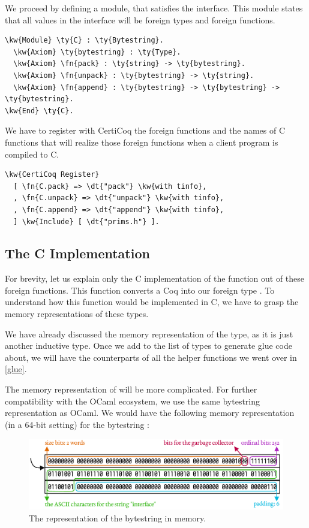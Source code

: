 We proceed by defining a module,  that satisfies the  interface. This module states that all values in the  interface will be \gls{foreign type}s and \gls{foreign function}s.

\newpage
\begin{Verbatim}
\kw{Module} \ty{C} : \ty{Bytestring}.
  \kw{Axiom} \ty{bytestring} : \ty{Type}.
  \kw{Axiom} \fn{pack} : \ty{string} -> \ty{bytestring}.
  \kw{Axiom} \fn{unpack} : \ty{bytestring} -> \ty{string}.
  \kw{Axiom} \fn{append} : \ty{bytestring} -> \ty{bytestring} -> \ty{bytestring}.
\kw{End} \ty{C}.
\end{Verbatim}

We have to register with CertiCoq the \gls{foreign function}s and the names of C functions that will realize those \gls{foreign function}s when a client program is compiled to C.

\begin{Verbatim}
\kw{CertiCoq Register}
  [ \fn{C.pack} => \dt{"pack"} \kw{with tinfo},
  , \fn{C.unpack} => \dt{"unpack"} \kw{with tinfo},
  , \fn{C.append} => \dt{"append"} \kw{with tinfo},
  ] \kw{Include} [ \dt{"prims.h"} ].
\end{Verbatim}

\subsection{The C Implementation}

For brevity, let us explain only the C implementation of the  function out of these \gls{foreign function}s. This function converts a Coq  into our \gls{foreign type} . To understand how this function would be implemented in C, we have to grasp the memory representations of these types.

We have already discussed the memory representation of the  type, as it is just another \gls{inductive type}. 
Once we add  to the list of types to generate \gls{glue code} about, we will have the  counterparts of all the helper functions we went over in \autoref{glue}.

The memory representation of  will be more complicated. For further compatibility with the OCaml ecosystem, we use the same bytestring representation as OCaml.
We would have the following memory representation (in a 64-bit setting) for the bytestring :

\begin{figure}[H]
\includegraphics[scale=.55]{figures/bytestring.pdf}
\centering
\caption{The representation of the bytestring  in memory.}
\end{figure}


